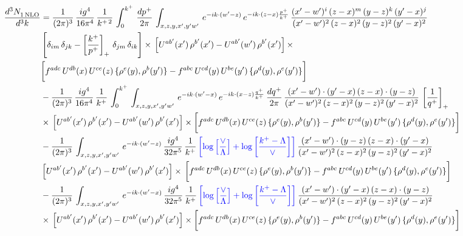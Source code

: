 \documentclass[9pt]{article}
\numberwithin{equation}{section}
\begin{document}
\begin{align}
     \frac{d^{3}N_{1\,\rm NLO}^{\rm}}{d^{3}k}  & = \frac{1}{(2\pi)^{3}}\, \frac{ig^{4}}{16\pi^{4}}\, \frac{1}{k^{+\,2}}\,\int_{0}^{k^{+}}\, \frac{dp^{+}}{2\pi}\,\int_{x,z,y,x',y'w'}\,e^{-ik\cdot (w^\prime-z)}\,e^{-ik\cdot (z-x)\frac{p^{+}}{k^{+}}}\,\frac{(x'-w')^{i}\,(z-x)^{m}\,(y-z)^{k}\,(y'-x)^{j}}{(x'-w')^{2}\,(z-x)^{2}\,(y-z)^{2}\,(y'-x)^{2}}\,\notag \\ & \left[\delta_{im}\,\delta_{jk}-\left[\frac{k^{+}}{p^{+}}\right]_{+}\, \delta_{jm}\,\delta_{ik}\right]\times\, \left[U^{ab'}(x')\,\rho^{b'}(x')-U^{ab'}(w')\,\rho^{b'}(x')\right]\times\notag \\ & \bigg[f^{adc}\,U^{db}(x)\,U^{ce}(z)\, \{\rho^{e}(y),\rho^{b}(y')\}-f^{abc}\,U^{cd}(y)\,U^{be}(y')\, \{\rho^{d}(y),\rho^{e}(y')\}\bigg]\notag \\ & -\frac{1}{(2\pi)^{3}}\, \frac{ig^{4}}{16\pi^{4}}\, \frac{1}{k^{+}}\,\int_{0}^{k^{+}}\, \int_{x,z,y,x',y'w'}\,e^{-ik\cdot (w^\prime-x)}\,e^{-ik\cdot (x-z)\frac{q^{+}}{k^{+}}}\,\frac{dq^{+}}{2\pi}\,\frac{(x'-w')\cdot (y'-x)\,(z-x)\cdot (y-z)}{(x'-w')^{2}\,(z-x)^{2}\,(y-z)^{2}\,(y'-x)^{2}}\,\left[\frac{1}{q^{+}}\right]_{+}\notag \\ & \times\, \left[U^{ab'}(x')\,\rho^{b'}(x')-U^{ab'}(w')\,\rho^{b'}(x')\right]\times \bigg[f^{adc}\,U^{db}(x)\,U^{ce}(z)\, \{\rho^{e}(y),\rho^{b}(y')\}-f^{abc}\,U^{cd}(y)\,U^{be}(y')\, \{\rho^{d}(y),\rho^{e}(y')\}\bigg]\notag \\ & -\frac{1}{(2\pi)^{3}}\, \int_{x,z,y,x',y'w'}\,e^{-ik\cdot (w^\prime-z)}\,\frac{ig^{4}}{32\pi^{5}}\, \frac{1}{k^{+}}\,{\color{blue}\left[\log{\left[\frac{\vee}{\Lambda}\right]} + \log{\left[\frac{k^{+}-\Lambda}{\vee}\right]}\right]}\,\frac{(x'-w')\cdot (y-z)\,(z-x)\cdot (y'-x)}{(x'-w')^{2}\,(z-x)^{2}\,(y-z)^{2}\,(y'-x)^{2}}\,\notag \\ & \left[U^{ab'}(x')\,\rho^{b'}(x')-U^{ab'}(w')\,\rho^{b'}(x')\right]\times\, \bigg[f^{adc}\,U^{db}(x)\,U^{ce}(z)\, \{\rho^{e}(y),\rho^{b}(y')\}-f^{abc}\,U^{cd}(y)\,U^{be}(y')\, \{\rho^{d}(y),\rho^{e}(y')\}\bigg]\notag \\ &  -\frac{1}{(2\pi)^{3}}\, \int_{x,z,y,x',y'w'}\,e^{-ik\cdot (w^\prime-x)}\,\frac{ig^{4}}{32\pi^{5}}\, \frac{1}{k^{+}}\,{\color{blue}\left[\log{\left[\frac{\vee}{\Lambda}\right]} + \log{\left[\frac{k^{+}-\Lambda}{\vee}\right]}\right]}\,\frac{(x'-w')\cdot (y'-x)\,(z-x)\cdot (y-z)}{(x'-w')^{2}\,(z-x)^{2}\,(y-z)^{2}\,(y'-x)^{2}}\notag \\ & \times\, \left[U^{ab'}(x')\,\rho^{b'}(x')-U^{ab'}(w')\,\rho^{b'}(x')\right]\times \bigg[f^{adc}\,U^{db}(x)\,U^{ce}(z)\, \{\rho^{e}(y),\rho^{b}(y')\}-f^{abc}\,U^{cd}(y)\,U^{be}(y')\, \{\rho^{d}(y),\rho^{e}(y')\}\bigg]
\end{align}
\end{document}
